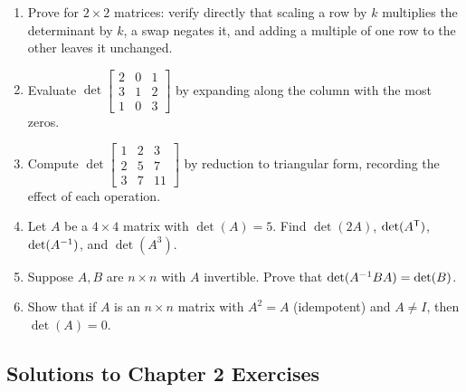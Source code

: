 \begin{enumerate}[label=\textbf{2.\arabic*},leftmargin=2.6em,itemsep=6pt]
\item Prove  for $2\times2$ matrices: verify directly that scaling a row by $k$ multiplies the determinant by $k$, a swap negates it, and adding a multiple of one row to the other leaves it unchanged.

\item Evaluate $\det\!\left[\begin{smallmatrix}2&0&1\\3&1&2\\1&0&3\end{smallmatrix}\right]$ by expanding along the column with the most zeros.

\item Compute $\det\!\left[\begin{smallmatrix}1&2&3\\2&5&7\\3&7&11\end{smallmatrix}\right]$ by reduction to triangular form, recording the effect of each operation.

\item Let $A$ be a $4\times4$ matrix with $\det(A)=5$. Find $\det(2A)$, $\det(A^{\mathsf{T}})$, $\det(A^{-1})$, and $\det(A^3)$.

\item Suppose $A,B$ are $n\times n$ with $A$ invertible. Prove that $\det(A^{-1} BA)=\det(B)$.

\item Show that if $A$ is an $n\times n$ matrix with $A^2=A$ (idempotent) and $A\neq I$, then $\det(A)=0$.
\end{enumerate}

\subsection*{Solutions to Chapter 2 Exercises}

